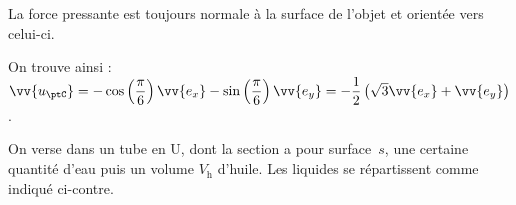 \begin{corrige}
La force pressante est toujours normale à la surface de l'objet
et orientée vers celui-ci. 

On trouve ainsi : $\vv{u_{\ptC}}=-\cos\left(\dfrac{\pi}{6}\right)\vv{e_{x}}-\sin\left(\dfrac{\pi}{6}\right)\vv{e_{y}}=-\dfrac{1}{2}\left(\sqrt{3}\vv{e_{x}}+\vv{e_{y}}\right)$.
\end{corrige}



\finEntrainement









\hauteurLargeurCadreReponse		{6mm}{35mm}
\typeEntrainement				{} %
\initialisationEntrainement

                                \initialisationPartieGauche %
On verse dans un tube en U, dont la section a pour surface~$s$, une certaine quantité d'eau puis un volume $V_\text{h}$ d'huile. Les liquides se répartissent comme indiqué ci-contre.

